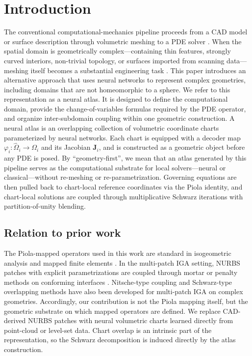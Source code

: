 \documentclass[sort&compress]{svjour3} %
\begin{document}
\section{Introduction} \label{sec:introduction}
The conventional computational-mechanics pipeline proceeds from a CAD model or surface description through volumetric meshing to a PDE solver \citep{de_souza_neto_computational_2011,simo_computational_1998,zienkiewicz_finite_2000}. When the spatial domain is geometrically complex---containing thin features, strongly curved interiors, non-trivial topology, or surfaces imported from scanning data---meshing itself becomes a substantial engineering task \citep{quey_large-scale_2011}. 
This paper introduces an alternative approach that uses neural networks to represent complex geometries, including domains that are not homeomorphic to a sphere.
We refer to this representation as a neural atlas. It is designed to define the computational domain, provide the change-of-variables formulas required by the PDE operator, and organize inter-subdomain coupling within one geometric construction.
A neural atlas is an overlapping collection of volumetric coordinate charts parameterized by neural networks. Each chart is equipped with a decoder map $\varphi_i:\widehat{\Omega}_i\to\Omega_i$ and its Jacobian $\mathbf{J}_i$, and is constructed as a geometric object before any PDE is posed. By ``geometry-first'', we mean that an atlas generated by this pipeline serves as the computational substrate for local solvers---neural or classical---without re-meshing or re-parametrization. Governing equations are then pulled back to chart-local reference coordinates via the Piola identity, and chart-local solutions are coupled through multiplicative Schwarz iterations with partition-of-unity blending.

\subsection{Relation to prior work}
The Piola-mapped operators used in this work are standard in isogeometric analysis \citep{hughes2005isogeometric,cottrell2009isogeometric} and mapped finite elements \citep{ciarlet2002finite}. In the multi-patch IGA setting, NURBS patches with explicit parametrizations are coupled through mortar or penalty methods on conforming interfaces \citep{brivadis2015isogeometric}. Nitsche-type coupling \citep{apostolatos2014nitsche} and Schwarz-type overlapping methods \citep{dittmann2019isogeometric} have also been developed for multi-patch IGA on complex geometries.
Accordingly, our contribution is not the Piola mapping itself, but the geometric substrate on which mapped operators are defined. We replace CAD-derived NURBS patches with neural volumetric charts learned directly from point-cloud or level-set data. Chart overlap is an intrinsic part of the representation, so the Schwarz decomposition is induced directly by the atlas construction.
\end{document}
